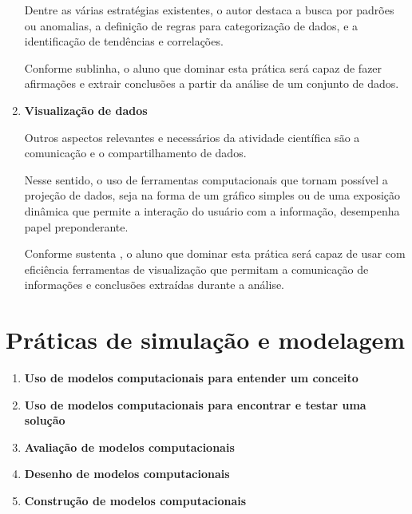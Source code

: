 \begin{enumerate}
  Dentre as várias estratégias existentes, o autor destaca a busca por padrões ou anomalias, a definição de regras para categorização de dados, e a identificação de tendências e correlações. 

  Conforme sublinha, o aluno que dominar esta prática será capaz de fazer afirmações e extrair conclusões a partir da análise de um conjunto de dados.


  \item \textbf{Visualização de dados}

  Outros aspectos relevantes e necessários da atividade científica são a comunicação e o compartilhamento de dados.

  Nesse sentido, o uso de ferramentas computacionais que tornam possível a projeção de dados, seja na forma de um gráfico simples ou de uma exposição dinâmica que permite a interação do usuário com a informação, desempenha papel preponderante.

  Conforme sustenta , o aluno que dominar esta prática será capaz de usar com eficiência ferramentas de visualização que permitam a comunicação de informações e conclusões extraídas durante a análise.

\end{enumerate}

\section{Práticas de simulação e modelagem}

\begin{enumerate}
  \item \textbf{Uso de modelos computacionais para entender um conceito}

  \item \textbf{Uso de modelos computacionais para encontrar e testar uma solução}

  \item \textbf{Avaliação de modelos computacionais}
  \item \textbf{Desenho de modelos computacionais}
  \item \textbf{Construção de modelos computacionais}
  
\end{enumerate}
















